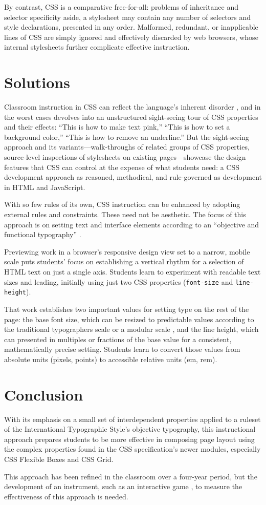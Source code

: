 \documentclass[sigconf,anonymous]{acmart}
\begin{document}
By contrast, CSS is a comparative free-for-all: problems of inheritance and selector specificity aside, a stylesheet may contain any number of selectors and style declarations, presented in any order. Malformed, redundant, or inapplicable lines of CSS are simply ignored and effectively discarded by web browsers, whose internal stylesheets further complicate effective instruction.

\section{Solutions}
Classroom instruction in CSS can reflect the language's inherent disorder \cite{pw:learning}, and in the worst cases devolves into an unstructured sight-seeing tour of CSS properties and their effects: “This is how to make text pink,” “This is how to set a background color,” “This is how to remove an underline.” But the sight-seeing approach and its variants—walk-throughs of related groups of CSS properties, source-level inspections of stylesheets on existing pages—showcase the design features that CSS can control at the expense of what students need: a CSS development approach as reasoned, methodical, and rule-governed as development in HTML and JavaScript.

With so few rules of its own, CSS instruction can be enhanced by adopting external rules and constraints. These need not be aesthetic. The focus of this approach is on setting text and interface elements according to an “objective and functional typography” \cite{mb:grid}.

Previewing work in a browser's responsive design view set to a narrow, mobile scale puts students' focus on establishing a vertical rhythm for a selection of HTML text on just a single axis. Students learn to experiment with readable text sizes and leading, initially using just two CSS properties (\verb|font-size| and \verb|line-height|). 

That work establishes two important values for setting type on the rest of the page: the base font size, which can be resized to predictable values according to the traditional typographers scale or a modular scale \cite{brown:modular}, and the line height, which can presented in multiples or fractions of the base value for a consistent, mathematically precise setting. Students learn to convert those values from absolute units (pixels, points) to accessible relative units (em, rem).

\section{Conclusion}
With its emphasis on a small set of interdependent properties applied to a ruleset of the International Typographic Style's objective typography, this instructional approach prepares students to be more effective in composing page layout using the complex properties found in the CSS specification's newer modules, especially CSS Flexible Boxes and CSS Grid.

This approach has been refined in the classroom over a four-year period, but the development of an instrument, such as an interactive game \cite{kim:understanding}, to measure the effectiveness of this approach is needed.



\end{document}
